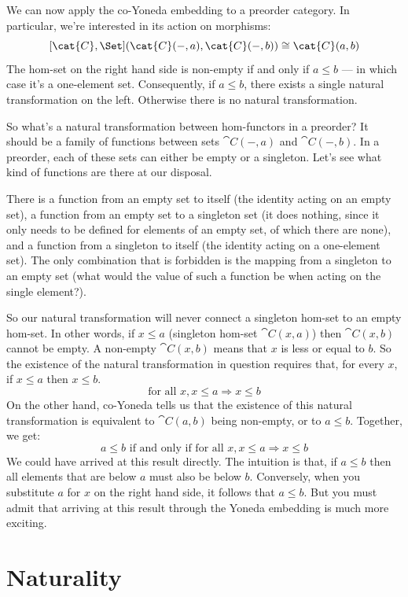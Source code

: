 We can now apply the co-Yoneda embedding to a preorder category. In
particular, we're interested in its action on morphisms:
\[[\cat{C}, \Set](\cat{C}(-, a), \cat{C}(-, b)) \cong \cat{C}(a, b)\]
The hom-set on the right hand side is non-empty if and only if
$a \leqslant b$ --- in which case it's a one-element set.
Consequently, if $a \leqslant b$, there exists a single
natural transformation on the left. Otherwise there is no natural
transformation.

So what's a natural transformation between hom-functors in a preorder?
It should be a family of functions between sets $\cat{C}(-, a)$ and
$\cat{C}(-, b)$. In a preorder, each of these sets can either be empty
or a singleton. Let's see what kind of functions are there at our
disposal.

There is a function from an empty set to itself (the identity acting on
an empty set), a function  from an empty set to a
singleton set (it does nothing, since it only needs to be defined for
elements of an empty set, of which there are none), and a function from
a singleton to itself (the identity acting on a one-element set). The
only combination that is forbidden is the mapping from a singleton to an
empty set (what would the value of such a function be when acting on the
single element?).

So our natural transformation will never connect a singleton hom-set to
an empty hom-set. In other words, if $x \leqslant a$
(singleton hom-set $\cat{C}(x, a)$) then $\cat{C}(x, b)$ cannot be
empty. A non-empty $\cat{C}(x, b)$ means that $x$ is less or
equal to $b$. So the existence of the natural transformation in
question requires that, for every $x$, if
$x \leqslant a$ then $x \leqslant b$.
\[\text{for all } x, x \leqslant a \Rightarrow x \leqslant b\]
On the other hand, co-Yoneda tells us that the existence of this natural
transformation is equivalent to $\cat{C}(a, b)$ being non-empty, or to
$a \leqslant b$. Together, we get:
\[a \leqslant b \text{ if and only if for all } x, x \leqslant a \Rightarrow x \leqslant b\]
We could have arrived at this result directly. The intuition is that, if
$a \leqslant b$ then all elements that are below $a$
must also be below $b$. Conversely, when you substitute
$a$ for $x$ on the right hand side, it follows that
$a \leqslant b$. But you must admit that arriving at this
result through the Yoneda embedding is much more exciting.

\section{Naturality}


